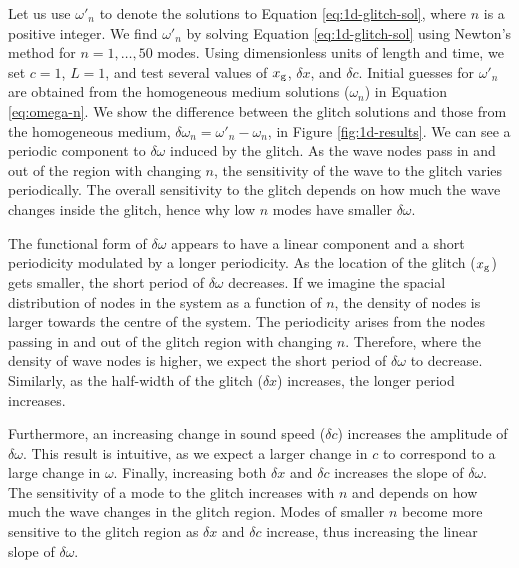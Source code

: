 Let us use \(\omega'_n\) to denote the solutions to Equation \ref{eq:1d-glitch-sol}, where \(n\) is a positive integer. We find \(\omega'_n\) by solving Equation \ref{eq:1d-glitch-sol} using Newton's method for \(n = 1,\dots,50\) modes. Using dimensionless units of length and time, we set \(c=1\), \(L=1\), and test several values of \(x_{{\mathrm{g}}}\), \(\delta x\), and \(\delta c\). Initial guesses for \(\omega'_n\) are obtained from the homogeneous medium solutions (\(\omega_n\)) in Equation \ref{eq:omega-n}. We show the difference between the glitch solutions and those from the homogeneous medium, \(\delta \omega_n = \omega'_n - \omega_n\), in Figure \ref{fig:1d-results}. We can see a periodic component to \(\delta\omega\) induced by the glitch. As the wave nodes pass in and out of the region with changing \(n\), the sensitivity of the wave to the glitch varies periodically. The overall sensitivity to the glitch depends on how much the wave changes inside the glitch, hence why low \(n\) modes have smaller \(\delta\omega\).


The functional form of \(\delta\omega\) appears to have a linear component and a short periodicity modulated by a longer periodicity. As the location of the glitch (\(x_{{\mathrm{g}}}\)) gets smaller, the short period of \(\delta\omega\) decreases. If we imagine the spacial distribution of nodes in the system as a function of \(n\), the density of nodes is larger towards the centre of the system. The periodicity arises from the nodes passing in and out of the glitch region with changing \(n\). Therefore, where the density of wave nodes is higher, we expect the short period of \(\delta\omega\) to decrease. Similarly, as the half-width of the glitch (\(\delta x\)) increases, the longer period increases. 

Furthermore, an increasing change in sound speed (\(\delta c\)) increases the amplitude of \(\delta\omega\). This result is intuitive, as we expect a larger change in \(c\) to correspond to a large change in \(\omega\). Finally, increasing both \(\delta x\) and \(\delta c\) increases the slope of \(\delta\omega\). The sensitivity of a mode to the glitch increases with \(n\) and depends on how much the wave changes in the glitch region. Modes of smaller \(n\) become more sensitive to the glitch region as \(\delta x\) and \(\delta c\) increase, thus increasing the linear slope of \(\delta\omega\).

